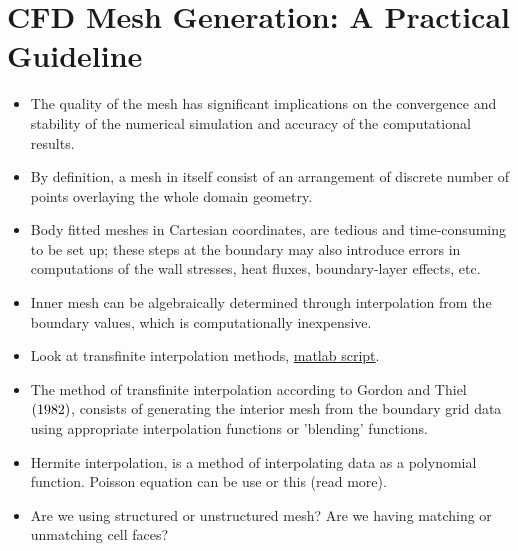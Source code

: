 \fi

    \section{CFD Mesh Generation: A Practical Guideline}
        \begin{itemize}
            \item The quality of the mesh has significant implications on the convergence and stability of the numerical simulation and accuracy of the computational results. 
            \item By definition, a mesh in itself consist of an arrangement of discrete number of points overlaying the whole domain geometry. 
            \item Body fitted meshes in Cartesian coordinates, are tedious and time-consuming to be set up; these steps at the boundary may also introduce errors in computations of the wall stresses, heat fluxes, boundary-layer effects, etc. 
            \item Inner mesh can be algebraically determined through interpolation from the boundary values, which is computationally inexpensive.   
            \item Look at transfinite interpolation methods, \href{https://www.mathworks.com/matlabcentral/fileexchange/40681-transfinite-interpolation}{matlab script}. 
            \item The method of transfinite interpolation according to Gordon and Thiel $\left(1982\right)$, consists of generating the interior mesh from the boundary grid data using appropriate interpolation functions or 'blending' functions. 
            \item Hermite interpolation, is a method of interpolating data as a polynomial function. Poisson equation can be use or this (read more).  
            \item Are we using structured or unstructured mesh? Are we having matching or unmatching cell faces? 
        \end{itemize}

\newpage
\printbibliography[title=Bibliography]

